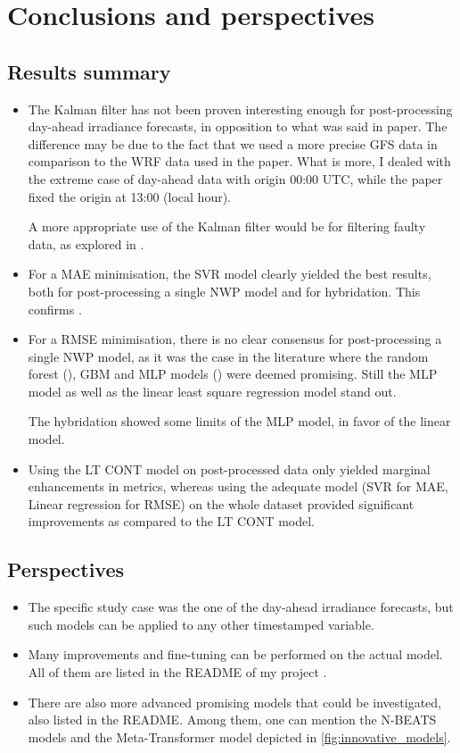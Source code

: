 \section{Conclusions and perspectives}
\subsection{Results summary}
\begin{itemize}
    \item The Kalman filter has not been proven interesting enough for post-processing day-ahead irradiance forecasts, in opposition to what was said in \cite{suksamosorn_post-processing_2021} paper. The difference may be due to the fact that we used a more precise GFS data in comparison to the WRF data used in the paper. What is more, I dealed with the extreme case of day-ahead data with origin 00:00 UTC, while the paper fixed the origin at 13:00 (local hour).

    A more appropriate use of the Kalman filter would be for filtering faulty data, as explored in \cite{sec:filtering}.
    \item For a MAE minimisation, the SVR model clearly yielded the best results, both for post-processing a single NWP model and for hybridation. This confirms \cite{verbois_statistical_2022}.
    \item For a RMSE minimisation, there is no clear consensus for post-processing a single NWP model, as it was the case in the literature where the random forest (\cite{suksamosorn_post-processing_2021}), GBM and MLP models (\cite{verbois_statistical_2022}) were deemed promising. Still the MLP model as well as the linear least square regression model stand out.

    The hybridation showed some limits of the MLP model, in favor of the linear model.
    \item Using the LT CONT model on post-processed data only yielded marginal enhancements in metrics, whereas using the adequate model (SVR for MAE, Linear regression for RMSE) on the whole dataset provided significant improvements as compared to the LT CONT model.
\end{itemize}

\subsection{Perspectives}
\begin{itemize}
    \item The specific study case was the one of the day-ahead irradiance forecasts, but such models can be applied to any other timestamped variable.
    \item Many improvements and fine-tuning can be performed on the actual model. All of them are listed in the README of my project \cite{myrepo}.
    \item There are also more advanced promising models that could be investigated, also listed in the README. Among them, one can mention the N-BEATS models and the Meta-Transformer model depicted in \autoref{fig:innovative_models}.
\end{itemize}

